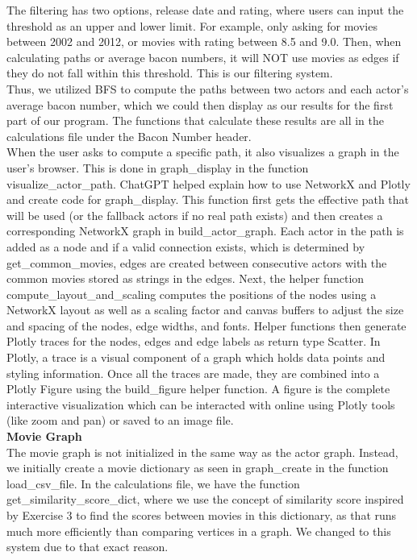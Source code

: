 \documentclass{article}
\begin{document}
The filtering has two options, release date and rating, where users can input the threshold as an upper and lower limit. For example, only asking for movies between 2002 and 2012, or movies with rating between 8.5 and 9.0. Then, when calculating paths or average bacon numbers, it will NOT use movies as edges if they do not fall within this threshold. This is our filtering system. \\

Thus, we utilized BFS to compute the paths between two actors and each actor's average bacon number, which we could then display as our results for the first part of our program. The functions that calculate these results are all in the calculations file under the Bacon Number header. \\

When the user asks to compute a specific path, it also visualizes a graph in the user’s browser. This is done in graph\_display in the function visualize\_actor\_path. ChatGPT helped explain how to use NetworkX and Plotly and create code for graph\_display. This function first gets the effective path that will be used (or the fallback actors if no real path exists) and then creates a corresponding NetworkX graph in build\_actor\_graph. Each actor in the path is added as a node and if a valid connection exists, which is determined by get\_common\_movies, edges are created between consecutive actors with the common movies stored as strings in the edges. Next, the helper function compute\_layout\_and\_scaling computes the positions of the nodes using a NetworkX layout as well as a scaling factor and canvas buffers to adjust the size and spacing of the nodes, edge widths, and fonts. Helper functions then generate Plotly traces for the nodes, edges and edge labels as return type Scatter. In Plotly, a trace is a visual component of a graph which holds data points and styling information. Once all the traces are made, they are combined into a Plotly Figure using the build\_figure helper function. A figure is the complete interactive visualization which can be interacted with online using Plotly tools (like zoom and pan) or saved to an image file. \\

\textbf{Movie Graph}\\
The movie graph is not initialized in the same way as the actor graph. Instead, we initially create a movie dictionary as seen in graph\_create in the function load\_csv\_file. In the calculations file, we have the function get\_similarity\_score\_dict, where we use the concept of similarity score inspired by Exercise 3 to find the scores between movies in this dictionary, as that runs much more efficiently than comparing vertices in a graph. We changed to this system due to that exact reason. \\
\end{document}
